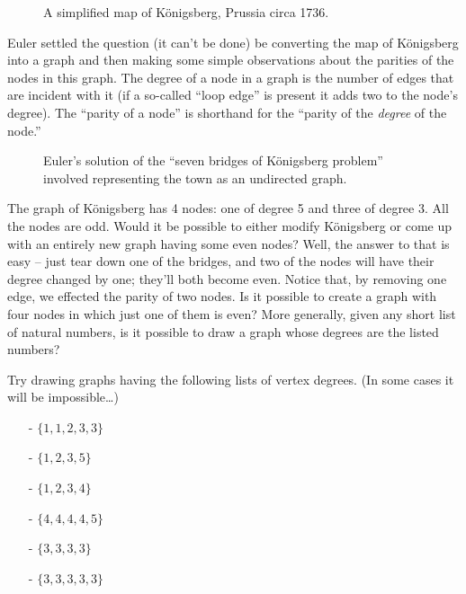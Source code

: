 \begin{figure}[!hbtp]
\begin{center}

\end{center}
\caption[K\"{o}nigsberg, Prussia.]{A simplified map of K\"{o}nigsberg, Prussia
circa 1736.}
\label{fig:kon_map} 
\end{figure}

Euler settled the question (it can't be done) be converting the map of 
K\"{o}nigsberg into a graph and then making some simple observations about
the parities of the nodes in this graph.  The  degree of a node
in a graph is the number of edges that are incident with it (if a so-called
``loop edge'' is present it adds two to the node's degree).  The ``parity
of a node'' is shorthand for the ``parity of the \emph{degree} of the node.'' 
 
\begin{figure}[!hbtp]
\begin{center}

\end{center}
\caption[K\"{o}nigsberg, Prussia as a graph.]{Euler's solution of the ``seven
bridges of K\"{o}nigsberg problem'' involved representing the town
as an undirected graph.}
\label{fig:kon_graph} 
\end{figure}

The graph of K\"{o}nigsberg has 4 nodes: one of degree 5 and three of degree
3.  All the nodes are odd.  Would it be possible to either modify 
K\"{o}nigsberg or come up with an entirely new graph having some even nodes?
Well, the answer to that is easy -- just tear down one of the bridges, and two
of the nodes will have their degree changed by one; they'll both become even.
Notice that, by removing one edge, we effected the parity of two nodes.  Is
it possible to create a graph with four nodes in which just one of them is
even?  More generally, given any short list of natural numbers, is it 
possible to draw a graph whose degrees are the listed numbers?

\begin{exer}
Try drawing graphs having the following lists of vertex degrees.
(In some cases it will be impossible\ldots)

\begin{itemize}
\item[-] $\{1,1,2,3,3\}$
\item[-] $\{1,2,3,5\}$
\item[-] $\{1,2,3,4\}$
\item[-] $\{4,4,4,4,5\}$
\item[-] $\{3,3,3,3\}$
\item[-] $\{3,3,3,3,3\}$
\end{itemize}
\end{exer}   
 
